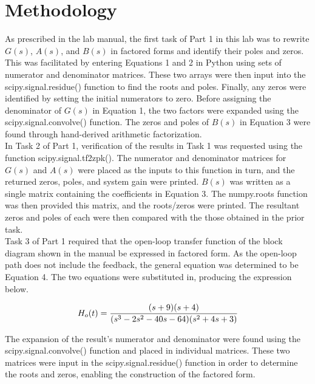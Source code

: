 \documentclass[12pt]{report}
\begin{document}
\section{Methodology}

As prescribed in the lab manual, the first task of Part 1 in this lab was to rewrite $ G(s) $, $ A(s) $, and $ B(s) $ in factored forms and identify their poles and zeros. This was facilitated by entering Equations 1 and 2 in Python using sets of numerator and denominator matrices. These two arrays were then input into the scipy.signal.residue() function to find the roots and poles. Finally, any zeros were identified by setting the initial numerators to zero. Before assigning the denominator of $ G(s) $ in Equation 1, the two factors were expanded using the scipy.signal.convolve() function. The zeros and poles of $ B(s) $ in Equation 3 were found through hand-derived arithmetic factorization. \\

In Task 2 of Part 1, verification of the results in Task 1 was requested using the function scipy.signal.tf2zpk(). The numerator and denominator matrices for $ G(s) $ and $ A(s) $ were placed as the inputs to this function in turn, and the returned zeros, poles, and system gain were printed. $ B(s) $ was written as a single matrix containing the coefficients in Equation 3. The numpy.roots function was then provided this matrix, and the roots/zeros were printed. The resultant zeros and poles of each were then compared with the those obtained in the prior task. \\

Task 3 of Part 1 required that the open-loop transfer function of the block diagram shown in the manual be expressed in factored form. As the open-loop path does not include the feedback, the general equation was determined to be Equation 4. The two equations were substituted in, producing the expression below.

\begin{equation*}
	H_o(t)= \frac{(s + 9)(s + 4)}{(s^3 - 2s^2 - 40s - 64)(s^2 + 4s + 3)} \\
\end{equation*}

The expansion of the result's numerator and denominator were found using the scipy.signal.convolve() function and placed in individual matrices. These two matrices were input in the scipy.signal.residue() function in order to determine the roots and zeros, enabling the construction of the factored form. \\
\end{document}
